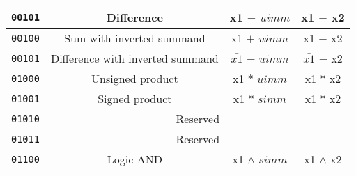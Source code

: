 \begin{center}
\begin{longtable}{|c|c|c|c|}
      \texttt{00101}                       &
      Difference                           &
      x1 $-$ $uimm$                        &
      x1 $-$ x2                            \\ \hline
                                           
      \texttt{00100}                       &
      Sum with inverted summand            &
      x1 $+$ $uimm$                        &
      x1 $+$ x2                            \\ \hline
                                           
      \texttt{00101}                       &
      Difference with inverted summand     &
      $\bar{x1}$ $-$ $uimm$                &
      $\bar{x1}$ $-$ x2                    \\ \hline
                                                                             
      \texttt{01000}                       &
      Unsigned product                     &
      x1 $*$ $uimm$                        &
      x1 $*$ x2                            \\ \hline
                                           
      \texttt{01001}                       &
      Signed product                       &
      x1 $*$ $simm$                        &
      x1 $*$ x2                            \\ \hline
                                           
      \texttt{01010}                       &
      \multicolumn{3}{c|}{Reserved}        \\ \hline
                                           
      \texttt{01011}                       &
      \multicolumn{3}{c|}{Reserved}        \\ \hline
                                       
      \texttt{01100}                       &
      Logic AND                            &
      x1 $\land$ $simm$                    &
      x1 $\land$ x2                        \\ \hline
                                           

\end{longtable}
\end{center}
